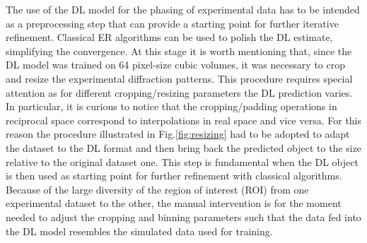 The use of the DL model for the phasing of experimental data has to be intended as a preprocessing step that can provide 
a starting point for further iterative refinement. Classical ER algorithms can be used to polish the DL estimate, simplifying 
the convergence.
At this stage it is worth mentioning that, since the DL model was trained on 64 pixel-size cubic volumes, it was necessary 
to crop and resize the experimental diffraction patterns. This procedure requires special attention as for different 
cropping/resizing parameters the DL prediction varies. In particular, it is curious to notice that the cropping/padding 
operations in reciprocal space correspond to interpolations in real space and vice versa. For this reason the procedure 
illustrated in Fig.\ref{fig:resizing} had to be adopted to adapt the dataset to the DL format and then bring back 
the predicted object to the size relative to the original dataset one. This step is fundamental when the DL object is then 
used as starting point for further refinement with classical algorithms.  
Because of the large diversity of the region of interest (ROI) from one experimental dataset to the other, the manual 
intervention is for the moment needed to adjust the cropping and binning parameters such that the data fed into the DL 
model resembles the simulated data used for training. 


